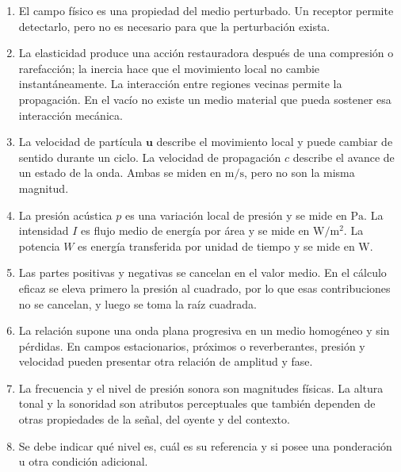 \begin{enumerate}[label=\textbf{C\arabic*.},leftmargin=*]
    \item El campo físico es una propiedad del medio perturbado. Un receptor
    permite detectarlo, pero no es necesario para que la perturbación exista.

    \item La elasticidad produce una acción restauradora después de una
    compresión o rarefacción; la inercia hace que el movimiento local no cambie
    instantáneamente. La interacción entre regiones vecinas permite la
    propagación. En el vacío no existe un medio material que pueda sostener
    esa interacción mecánica.

    \item La velocidad de partícula \(\mathbf u\) describe el movimiento local
    y puede cambiar de sentido durante un ciclo. La velocidad de propagación
    \(c\) describe el avance de un estado de la onda. Ambas se miden en
    \(\text{m}/\text{s}\), pero no son la misma magnitud.

    \item La presión acústica \(p\) es una variación local de presión y se mide
    en \(\text{Pa}\). La intensidad \(I\) es flujo medio de energía por área y
    se mide en \(\text{W}/\text{m}^2\). La potencia \(W\) es energía
    transferida por unidad de tiempo y se mide en \(\text{W}\).

    \item Las partes positivas y negativas se cancelan en el valor medio. En
    el cálculo eficaz se eleva primero la presión al cuadrado, por lo que esas
    contribuciones no se cancelan, y luego se toma la raíz cuadrada.

    \item La relación supone una onda plana progresiva en un medio homogéneo y
    sin pérdidas. En campos estacionarios, próximos o reverberantes, presión y
    velocidad pueden presentar otra relación de amplitud y fase.

    \item La frecuencia y el nivel de presión sonora son magnitudes físicas.
    La altura tonal y la sonoridad son atributos perceptuales que también
    dependen de otras propiedades de la señal, del oyente y del contexto.

    \item Se debe indicar qué nivel es, cuál es su referencia y si posee una
    ponderación u otra condición adicional.
\end{enumerate}

